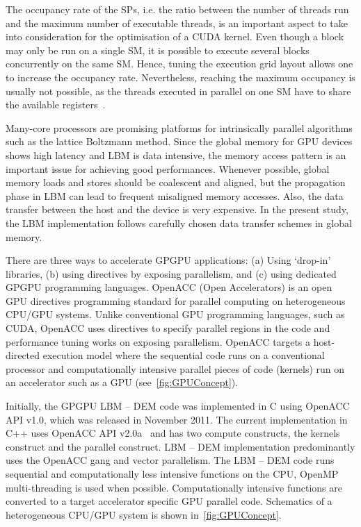 The occupancy rate of the SPs, i.e. the ratio between the 
number of threads run and the maximum number of executable threads, is an 
important aspect to take into consideration for the optimisation of a CUDA 
kernel. Even though a block may only be run on a single SM, it is possible to 
execute several blocks concurrently on the same SM. Hence, tuning the execution 
grid layout allows one to increase the occupancy rate. Nevertheless, reaching 
the maximum occupancy is usually not possible, as the threads executed in 
parallel on one SM have to share the available registers~\citep{Obrecht2011}.

Many-core processors are promising platforms for intrinsically parallel 
algorithms such as the lattice Boltzmann method. Since the global memory 
for GPU devices shows high latency and LBM is data intensive, the
memory access pattern is an important issue for achieving good performances. 
Whenever possible, global memory loads and stores should be coalescent and 
aligned, but the propagation phase in LBM can lead to frequent misaligned 
memory accesses. Also, the data transfer between the host and the device is 
very expensive. In the present study, the LBM implementation follows carefully 
chosen data transfer schemes in global memory.

There are three ways to accelerate GPGPU applications: (a) Using `drop-in' 
libraries, (b) using directives by exposing parallelism, and (c) using 
dedicated GPGPU programming languages. OpenACC (Open Accelerators) is an open 
GPU directives programming standard for parallel computing on heterogeneous 
CPU/GPU systems. Unlike conventional GPU programming languages, such as CUDA, 
OpenACC uses directives to specify parallel regions in the code and performance 
tuning works on exposing parallelism. OpenACC targets a host-directed execution 
model where the sequential code runs on a conventional processor and 
computationally intensive parallel pieces of code (kernels) run on an 
accelerator such as a GPU (see~\cref{fig:GPUConcept}). 

Initially, the GPGPU LBM -- DEM code was implemented in C using OpenACC API 
v1.0, which was released in November 2011. The current implementation in C++ 
uses OpenACC API v2.0a~\citep{OpenACCmembers2013} and has two compute 
constructs, the kernels construct and the parallel construct. LBM -- DEM 
implementation predominantly uses the OpenACC gang and vector parallelism. The 
LBM -- DEM code runs sequential and computationally less intensive 
functions on the CPU, OpenMP multi-threading is used when possible. 
Computationally intensive functions are converted to a target accelerator 
specific GPU parallel code. Schematics of a heterogeneous CPU/GPU system is 
shown in~\cref{fig:GPUConcept}.

